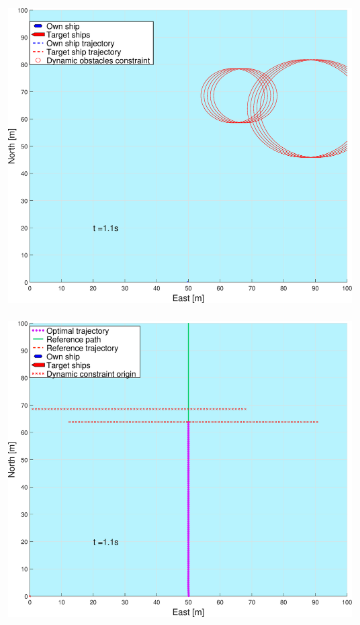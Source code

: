 \begin{figure}[ht!] %
    \begin{subfigure}[b]{0.49\textwidth}
        \centering
        \includegraphics[width=\textwidth]{Images/Figures/enkel_GW/_Simple_0fig1_time=1}
        \subcaption{}
    \end{subfigure}
    \hfill
    \begin{subfigure}[b]{0.499\textwidth}
        \centering
        \includegraphics[width=\textwidth]{Images/Figures/enkel_GW/_Simple_0fig999_time=1}

\end{subfigure}
\end{figure}
